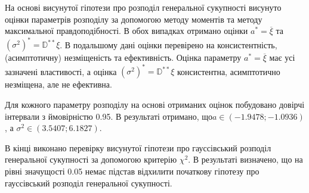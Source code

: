 \documentclass[14pt, a4paper, ukrainian]{extreport}
\begin{document}
	На основі висунутої гіпотези про розподіл генеральної сукупності висунуто оцінки параметрів розподілу за допомогою методу моментів та методу максимальної правдоподібності. В обох випадках отримано оцінки $a^* = \overline{\xi}$ та $(\sigma^2)^* = \mathbb{D}^{**}\xi$. В подальшому дані оцінки перевірено на консистентність, (асимптотичну) незміщеність та ефективність. Оцінка параметру $a^* = \overline{\xi}$ має усі зазначені властивості, а оцінка $(\sigma^2)^* = \mathbb{D}^{**}\xi$ консистентна, асимптотично незміщена, але не ефективна.
	
	Для кожного параметру розподілу на основі отриманих оцінок побудовано довірчі інтервали з ймовірністю 0.95. В результаті отримано, що\break $a \in (-1.9478; -1.0936)$, а $\sigma^2 \in (3.5407;6.1827)$.
	
	В кінці виконано перевірку висунутої гіпотези про гауссівський розподіл генеральної сукупності за допомогою критерію $\chi^2$. В результаті визначено, що на рівні значущості 0.05 немає підстав відхилити початкову гіпотезу про гауссівський розподіл генеральної сукупності.
	
	
\end{document}
